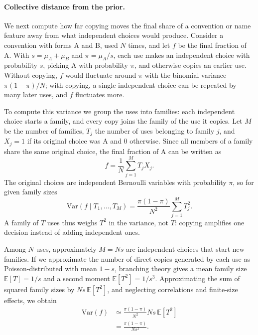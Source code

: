 \documentclass[11pt]{article}
\begin{document}
\paragraph{Collective distance from the prior.}

We next compute how far copying moves the final share of a convention or name feature away from what independent choices would produce. Consider a convention with forms A and B, used $N$ times, and let $f$ be the final fraction of A. With $s=\mu_A+\mu_B$ and $\pi=\mu_A/s$, each use makes an independent choice with probability $s$, picking A with probability $\pi$, and otherwise copies an earlier use. Without copying, $f$ would fluctuate around $\pi$ with the binomial variance $\pi(1-\pi)/N$; with copying, a single independent choice can be repeated by many later uses, and $f$ fluctuates more.

To compute this variance we group the uses into families: each independent choice starts a family, and every copy joins the family of the use it copies. Let $M$ be the number of families, $T_j$ the number of uses belonging to family $j$, and $X_j=1$ if its original choice was A and $0$ otherwise. Since all members of a family share the same original choice, the final fraction of A can be written as
\begin{equation}
f=\frac{1}{N}\sum_{j=1}^{M}T_jX_j.
\end{equation}
The original choices are independent Bernoulli variables with probability $\pi$, so for given family sizes
\begin{equation}
\mathrm{Var}(f\mid T_1,\ldots,T_M)
=\frac{\pi(1-\pi)}{N^2}
\sum_{j=1}^{M}T_j^2.
\end{equation}
A family of $T$ uses thus weighs $T^2$ in the variance, not $T$: copying amplifies one decision instead of adding independent ones.

Among $N$ uses, approximately $M=Ns$ are independent choices that start new families. If we approximate the number of direct copies generated by each use as Poisson-distributed with mean $1-s$, branching theory gives a mean family size $\mathbb E[T]=1/s$ and a second moment $\mathbb E[T^2]=1/s^3$. Approximating the sum of squared family sizes by $Ns\,\mathbb E[T^2]$, and neglecting correlations and finite-size effects, we obtain
\begin{equation}
\begin{aligned}
\mathrm{Var}(f)
&\simeq \frac{\pi(1-\pi)}{N^2}
Ns\,\mathbb E[T^2]\\
&=\frac{\pi(1-\pi)}{Ns^2}.
\end{aligned}
\label{eq:var}
\end{equation}
\end{document}

